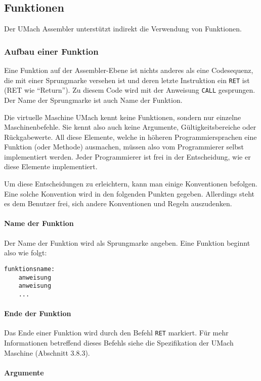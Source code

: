\subsection{Funktionen}

Der UMach Assembler unterstützt indirekt die Verwendung von Funktionen.

\subsubsection{Aufbau einer Funktion}

Eine Funktion auf der Assembler-Ebene ist nichts anderes als eine Codesequenz,
die mit einer Sprungmarke versehen ist und deren letzte Instruktion ein
\texttt{RET} ist (RET wie ``Return''). Zu diesem Code wird mit der Anweisung
\texttt{CALL} gesprungen. Der Name der Sprungmarke ist auch Name der Funktion.

Die virtuelle Maschine UMach kennt keine Funktionen, sondern nur einzelne
Maschinenbefehle. Sie kennt also auch keine Argumente, Gültigkeitsbereiche oder
Rückgabewerte. All diese Elemente, welche in höheren Programmiersprachen eine
Funktion (oder Methode) ausmachen, müssen also vom Programmierer selbst
implementiert werden. Jeder Programmierer ist frei in der Entscheidung, wie er
diese Elemente implementiert.

Um diese Entscheidungen zu erleichtern, kann man einige Konventionen befolgen.
Eine solche Konvention wird in den folgenden Punkten gegeben. Allerdings steht
es dem Benutzer frei, sich andere Konventionen und Regeln auszudenken.

\paragraph{Name der Funktion}
Der Name der Funktion wird als Sprungmarke angeben. Eine Funktion beginnt also
wie folgt:
\begin{lstlisting}
funktionsname:
    anweisung
    anweisung
    ...
\end{lstlisting}

\paragraph{Ende der Funktion}

Das Ende einer Funktion wird durch den Befehl \texttt{RET} markiert.
Für mehr Informationen betreffend dieses Befehls siehe die Spezifikation der
UMach Maschine (Abschnitt 3.8.3).

\paragraph{Argumente}

